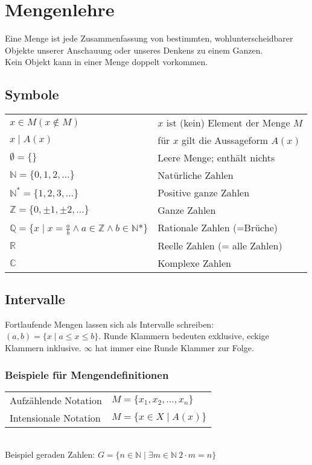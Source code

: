 \section{Mengenlehre}
Eine Menge ist jede Zusammenfassung von bestimmten, wohlunterscheidbarer Objekte
unserer Anschauung oder unseres Denkens zu einem Ganzen.\\
Kein Objekt kann in einer Menge doppelt vorkommen.

\subsection{Symbole}
\begin{tabular}{@{}p{\the\MyLenA}%
				@{}p{\linewidth-\the\MyLenA}}
	$x \in M (x \notin M)$ & $x$ ist (kein) Element der Menge $M$ \\
	$x \mid A(x)$ & für $x$ gilt die Aussageform $A(x)$\\
	$\emptyset = \{\}$ & Leere Menge; enthält nichts\\
	$\mathbb{N} = \{0, 1, 2, \dots\}$	& Natürliche Zahlen\\
	$\mathbb{N}^* = \{1, 2, 3, \dots\}$	& Positive ganze Zahlen\\
	$\mathbb{Z} = \{0, \pm1, \pm2, \dots\}$	& Ganze Zahlen\\
	$\mathbb{Q} = \{x\mid x = \frac{a}{b} \wedge a \in \mathbb{Z} \wedge b \in \mathbb{N}$*$\}$ & Rationale Zahlen (=Brüche)\\
	$\mathbb{R}$ & Reelle Zahlen (= alle Zahlen)\\
	$\mathbb{C}$ & Komplexe Zahlen\\
\end{tabular}

\subsection{Intervalle}
Fortlaufende Mengen lassen sich als Intervalle schreiben: $(a,b) = \{x \mid a \leq x \leq b\}$.
Runde Klammern bedeuten exklusive, eckige Klammern inklusive. $\infty$ hat immer eine Runde Klammer zur Folge.

\subsubsection{Beispiele für Mengendefinitionen}
\begin{tabular}{ll}
	Aufzählende Notation & $M = \{x_1, x_2, \dots, x_n\}$\\
	Intensionale Notation & $M = \{x \in X \mid A(x)\}$ 
\end{tabular}\\
Beispiel geraden Zahlen: $G = \{n \in \mathbb{N} \mid \exists m \in \mathbb{N}~2 \cdot m = n\}$ \\

